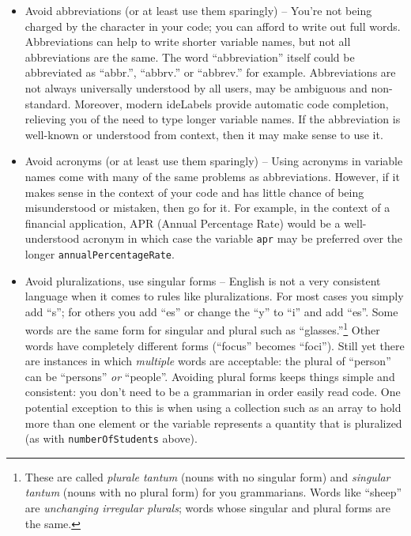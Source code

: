 \begin{itemize}
  \item Avoid abbreviations (or at least use them sparingly) -- You're not being charged 
  	by the character in your code; you can afford to write out full words.  Abbreviations
	can help to write shorter variable names, but not all abbreviations are the same. 
	The word ``abbreviation'' itself could be abbreviated as ``abbr.'', ``abbrv.'' or ``abbrev.''
	for example.  Abbreviations are not always universally understood by all users, may be
	ambiguous and non-standard.  Moreover, modern \glspl{ideLabel} provide automatic code 
	completion, relieving you of the need to type longer variable names.  If the abbreviation 
	is well-known or understood from context, then it may make sense to use it.
  \item Avoid acronyms (or at least use them sparingly) -- Using acronyms in variable
  	names come with many of the same problems as abbreviations.  However, if it 
	makes sense in the context of your code and has little chance of being misunderstood
	or mistaken, then go for it.  For example, in the context of a financial application, 
	APR (Annual Percentage Rate) would be a well-understood acronym in which case
	the variable \texttt{apr} may be preferred over the longer \texttt{annualPercentageRate}.
  \item Avoid pluralizations, use singular forms -- English is not a very consistent language when it comes to 
  	rules like pluralizations.  For most cases you simply add ``s''; for others you add ``es'' or change the ``y'' to
	``i'' and add ``es''.  Some words are the same form for singular and plural such as ``glasses.''\footnote{These
	are called \emph{plurale tantum} (nouns with no singular form) and \emph{singular tantum} (nouns with
	no plural form) for you grammarians.  Words like ``sheep'' are \emph{unchanging irregular plurals}; words
	whose singular and plural forms are the same.}  Other words have completely different forms 
	(``focus'' becomes ``foci'').  Still yet there are instances in which \emph{multiple} words are acceptable:
	the plural of ``person'' can be ``persons'' \emph{or} ``people''.  Avoiding plural forms keeps things simple
	and consistent: you don't need to be a grammarian in order easily read code.  One potential 
	exception to this is when using a collection such as an array to hold more than one element or
	the variable represents a quantity that is pluralized (as with \texttt{numberOfStudents} above).
\end{itemize}

